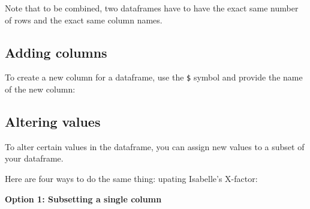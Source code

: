 \documentclass[
]{book}
\newenvironment{Shaded}{\begin{snugshade}}{\end{snugshade}}
\newcommand{\DecValTok}[1]{\textcolor[rgb]{0.00,0.00,0.81}{#1}}
\newcommand{\FunctionTok}[1]{\textcolor[rgb]{0.00,0.00,0.00}{#1}}
\newcommand{\NormalTok}[1]{#1}
\newcommand{\OtherTok}[1]{\textcolor[rgb]{0.56,0.35,0.01}{#1}}
\newcommand{\SpecialCharTok}[1]{\textcolor[rgb]{0.00,0.00,0.00}{#1}}
\begin{document}
Note that to be combined, two dataframes have to have the exact same number of rows and the exact same column names.

\hypertarget{adding-columns}{%
\subsection*{Adding columns}\label{adding-columns}}

To create a new column for a dataframe, use the \texttt{\$} symbol and provide the name of the new column:

\begin{Shaded}
\end{Shaded}

\hypertarget{altering-values}{%
\subsection*{Altering values}\label{altering-values}}

To alter certain values in the dataframe, you can assign new values to a subset of your dataframe.

Here are four ways to do the same thing: upating Isabelle's X-factor:

\textbf{Option 1: Subsetting a single column}

\begin{Shaded}
\end{Shaded}
\end{document}
